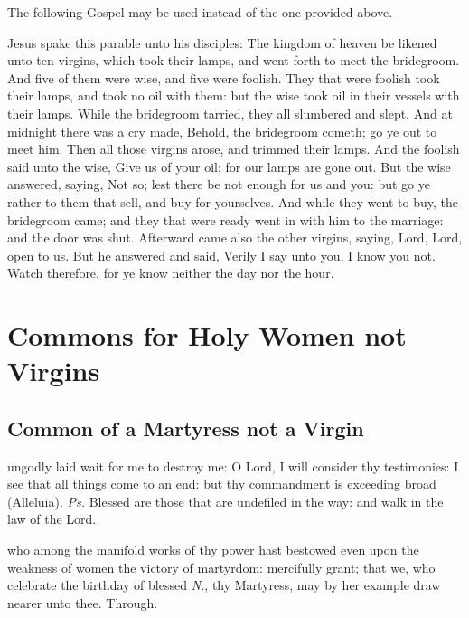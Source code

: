\begin{rubric}
	The following Gospel may be used instead of the one provided above.
\end{rubric}
 Jesus spake this parable unto his disciples: The kingdom of heaven be likened unto ten virgins, which took their lamps, and went forth to meet the bridegroom. And five of them were wise, and five were foolish. They that were foolish took their lamps, and took no oil with them: but the wise took oil in their vessels with their lamps. While the bridegroom tarried, they all slumbered and slept. And at midnight there was a cry made, Behold, the bridegroom cometh; go ye out to meet him. Then all those virgins arose, and trimmed their lamps. And the foolish said unto the wise, Give us of your oil; for our lamps are gone out. But the wise answered, saying, Not so; lest there be not enough for us and you: but go ye rather to them that sell, and buy for yourselves. And while they went to buy, the bridegroom came; and they that were ready went in with him to the marriage: and the door was shut. Afterward came also the other virgins, saying, Lord, Lord, open to us. But he answered and said, Verily I say unto you, I know you not. Watch therefore, for ye know neither the day nor the hour.


\clearpage
\section{Commons for Holy Women not Virgins}

\subsection{Common of a Martyress not a Virgin}\label{CommonMartyrNotVirgin}

\introit
{} ungodly laid wait for me to destroy me: O Lord, I will consider thy testimonies: I see that all things come to an end: but thy commandment is exceeding broad (Alleluia). \textit{Ps.} Blessed are those that are undefiled in the way: and walk in the law of the Lord.

\collect
{} who among the manifold works of thy power hast bestowed even upon the weakness of women the victory of martyrdom: mercifully grant; that we, who celebrate the birthday of blessed \textit{N.}, thy Martyress, may by her example draw nearer unto thee. Through.

